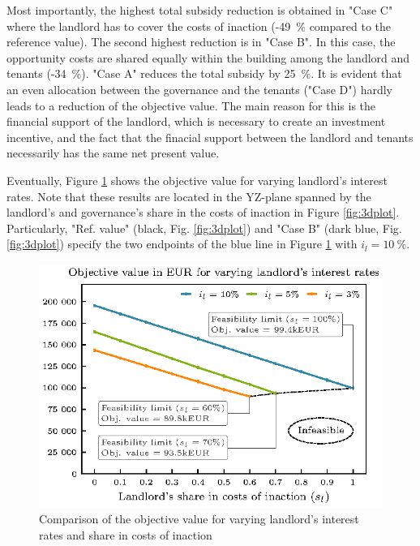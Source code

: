 Most importantly, the highest total subsidy reduction is obtained in "Case C" where the landlord has to cover the costs of inaction (-\SI{49}{\%} compared to the reference value). The second highest reduction is in "Case B". In this case, the opportunity costs are shared equally within the building among the landlord and tenants (-\SI{34}{\%}). "Case A" reduces the total subsidy by \SI{25}{\%}.  It is evident that an even allocation between the governance and the tenants ("Case D") hardly leads to a reduction of the objective value. The main reason for this is the financial support of the landlord, which is necessary to create an investment incentive, and the fact that the finacial support between the landlord and tenants necessarily has the same net present value.\vspace{0.5cm}

Eventually, Figure \ref{fig:feasible} shows the objective value for varying landlord's interest rates. Note that these results are located in the YZ-plane spanned by the landlord's and governance's share in the costs of inaction in Figure \ref{fig:3dplot}. Particularly, "Ref. value" (black, Fig. \ref{fig:3dplot}) and "Case B" (dark blue, Fig. \ref{fig:3dplot}) specify the two endpoints of the blue line in Figure \ref{fig:feasible} with $i_l=\SI{10}{\%}$. 

\begin{figure}[h]
	\centering
	\includegraphics[width=0.7\linewidth]{figures/4_Results/fig_feasible/feasible.eps}
	\caption{Comparison of the objective value for varying landlord's interest rates and share in costs of inaction}
	\label{fig:feasible}
\end{figure}

